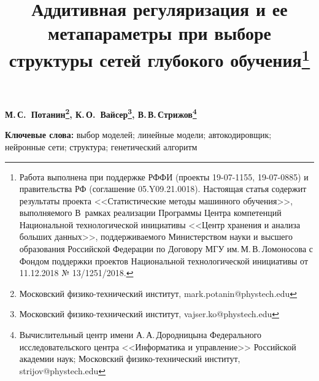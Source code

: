 \documentclass[12pt, twoside]{article}
\begin{document}
\title{\textbf{Аддитивная регуляризация и ее метапараметры при выборе структуры сетей глубокого обучения}\thanks{Работа выполнена при поддержке РФФИ (проекты 19-07-1155, 19-07-0885) и правительства РФ (соглашение 05.Y09.21.0018). Настоящая статья содержит результаты проекта <<Статистические методы машинного обучения>>, выполняемого В~рамках реализации Программы Центра компетенций Национальной технологической инициативы <<Центр хранения и анализа больших данных>>, поддерживаемого Министерством науки и высшего образования Российской Федерации по Договору МГУ им.\,М.\,В.\,Ломоносова  с Фондом поддержки проектов Национальной технологической инициативы от 11.12.2018 № 13/1251/2018.}}
\date{}
\maketitle

\begin{center}
\bf
М.\,С.~Потанин\footnote{Московский физико-технический институт, mark.potanin@phystech.edu}, К.\,О.~Вайсер\footnote{Московский физико-технический институт, vajser.ko@phystech.edu},  В.\,В.\,Стрижов\footnote{Вычислительный центр имени А.\,А.\,Дородницына Федерального исследовательского центра <<Информатика и управление>> Российской академии наук; Московский физико-технический институт, strijov@phystech.edu}
\end{center}

\begin{abstract}	

\end{abstract}

{\bf Ключевые слова:} выбор моделей; линейные модели; автокодировщик; нейронные сети; структура; генетический алгоритм

\setcounter{secnumdepth}{0}
\end{document}
